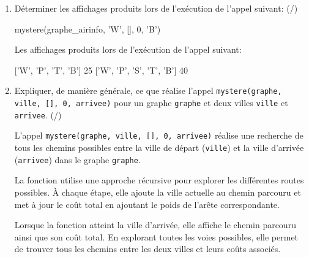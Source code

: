 \begin{enumerate}[resume=monDS]
    \item Déterminer les affichages produits lors de l'exécution de l'appel suivant: (/)
\begin{CodePythontexAlt}[TaillePolice=\large, Largeur=1\linewidth,Centre,Lignes=true,PremLigne=1]{}
mystere(graphe_airinfo, 'W', [], 0, 'B')
\end{CodePythontexAlt}
\begin{blocvisible}[height=3]
    Les affichages produits lors de l'exécution de l'appel suivant:
\begin{CodePythontexAlt}[TaillePolice=\large, Largeur=1\linewidth,Centre,Lignes=true,PremLigne=1]{}
['W', 'P', 'T', 'B'] 25
['W', 'P', 'S', 'T', 'B'] 40
\end{CodePythontexAlt}
\end{blocvisible}

\medskip

\item Expliquer, de manière générale, ce que réalise l'appel \texttt{mystere(graphe, ville, [], 0, arrivee)} pour un graphe \texttt{graphe} et deux villes \texttt{ville} et \texttt{arrivee}. (/)
\begin{blocvisible}[height=5]
    L'appel \texttt{mystere(graphe, ville, [], 0, arrivee)} réalise une recherche de tous les chemins possibles entre la ville de départ (\texttt{ville}) et la ville d'arrivée (\texttt{arrivee}) dans le graphe \texttt{graphe}. 

    La fonction utilise une approche récursive pour explorer les différentes routes possibles. À chaque étape, elle ajoute la ville actuelle au chemin parcouru et met à jour le coût total en ajoutant le poids de l'arête correspondante. 

    Lorsque la fonction atteint la ville d'arrivée, elle affiche le chemin parcouru ainsi que son coût total. En explorant toutes les voies possibles, elle permet de trouver tous les chemins entre les deux villes et leurs coûts associés.
\end{blocvisible}


\end{enumerate}
            
